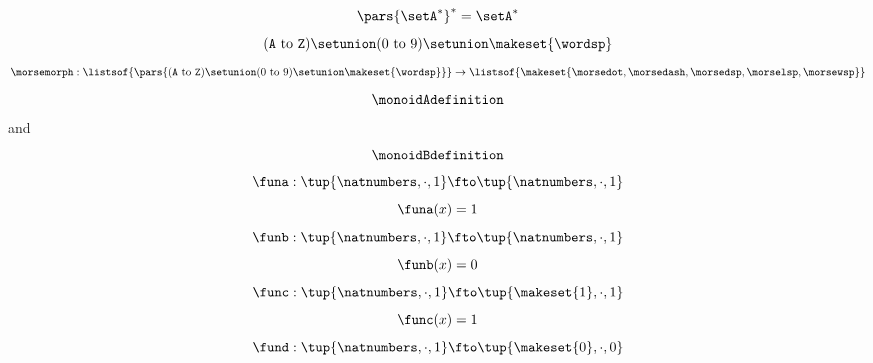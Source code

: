 {\begin{forslides}
\begin{equation}
    \end{equation}
    \begin{equation}
        \label{eq:moresemapnote}
        \pars{\setA^*}^*= \setA^*
    \end{equation}
    \begin{equation}
        \label{eq:morsemorph20}
        (\texttt{A} \ \text{to}\ \texttt{Z}) \setunion (0 \ \text{to}\ 9) \setunion \makeset{\wordsp}
    \end{equation}
    \begin{equation}
        \label{eq:morsemorph2}
        \morsemorph :
        \listsof{ \pars{
                (\texttt{A} \ \text{to}\ \texttt{Z}) \setunion (0 \ \text{to}\ 9) \setunion \makeset{\wordsp}
            }}
        \to  \listsof{\makeset{ \morsedot,  \morsedash,  \morsedsp,  \morselsp, \morsewsp }}
    \end{equation}
    \begin{equation}
        \label{eq:monoidA}
        \monoidAdefinition
    \end{equation}
    and
    \begin{equation}
        \label{eq:monoidB}
        \monoidBdefinition
    \end{equation}
    \begin{equation}
        \label{eq:quiz-1}
        \funa: \tup{\natnumbers, \cdot,  1} \fto \tup{\natnumbers, \cdot,  1}
    \end{equation}
    \begin{equation}
        \label{eq:quiz-1-def}
        \funa(x) = 1
    \end{equation}
    \begin{equation}
        \label{eq:quiz-2}
        \funb: \tup{\natnumbers, \cdot,  1} \fto \tup{\natnumbers, \cdot,  1}
    \end{equation}
    \begin{equation}
        \label{eq:quiz-2-def}
        \funb(x) = 0
    \end{equation}
    \begin{equation}
        \label{eq:quiz-3}
        \func: \tup{\natnumbers, \cdot,  1} \fto \tup{\makeset{1}, \cdot,  1}
    \end{equation}
    \begin{equation}
        \label{eq:quiz-3-def}
        \func(x) = 1
    \end{equation}
    \begin{equation}
        \label{eq:quiz-4}
        \fund: \tup{\natnumbers, \cdot,  1} \fto \tup{\makeset{0}, \cdot,  0}

\end{equation}
\end{forslides}}
